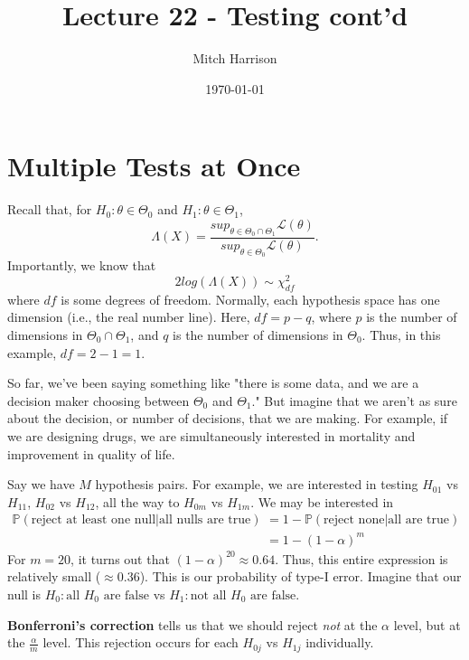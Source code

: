 \documentclass[titlepage, 12pt, leqno]{article}
\title{\Huge{Lecture 22 - Testing cont'd}}
\author{\large{Mitch Harrison}}
\date{\today}
\begin{document}
\setlength{\parskip}{1\baselineskip}
\setlength{\parindent}{15pt}
\maketitle
\tableofcontents
\newpage


\section{Multiple Tests at Once}

Recall that, for $H_{0}:\theta \in \Theta_{0}$ and $H_{1}:\theta \in \Theta_{1}$,
\[
\Lambda(X) = \frac{sup_{\theta \in \Theta_{0} \cap \Theta_{1}}
\mathcal{L}(\theta)}{sup_{\theta \in \Theta_{0}}\mathcal{L}(\theta)}.
\]
Importantly, we know that
\[
2log(\Lambda(X)) \sim \chi^{2}_{df}
\]
where $df$ is some degrees of freedom. Normally, each hypothesis space has one
dimension (i.e., the real number line). Here, $df = p - q$, where $p$ is the
number of dimensions in $\Theta_{0} \cap \Theta_{1}$, and $q$ is the number of
dimensions in $\Theta_{0}$. Thus, in this example, $df = 2 - 1 = 1$.

So far, we've been saying something like "there is some data, and we are a
decision maker choosing between $\Theta_{0}$ and $\Theta_{1}$." But imagine that
we aren't as sure about the decision, or number of decisions, that we are 
making. For example, if we are designing drugs, we are simultaneously interested
in mortality and improvement in quality of life. 

Say we have $M$ hypothesis pairs. For example, we are interested in testing
$H_{01}$ vs $H_{11}$, $H_{02}$ vs $H_{12}$, all the way to $H_{0m}$ vs
$H_{1m}$. We may be interested in
\begin{align*}
\mathbb{P}( \text{reject at least one null} | \text{all nulls are true})
&= 1 - \mathbb{P}( \text{reject none} | \text{all are true}) \\
&= 1 - (1 - \alpha)^{m}
\end{align*}
For $m = 20$, it turns out that $(1-\alpha)^{20} \approx 0.64$. Thus, this
entire expression is relatively small ($\approx 0.36$). This is our probability
of type-I error. Imagine that our null is $H_{0}: \text{all $H_{0}$ are false}$ 
vs $H_{1}: \text{not all $H_{0}$ are false}$.

\begin{definition}
    \textbf{Bonferroni's correction} tells us that we should reject \textit{not}
    at the $\alpha$ level, but at the $\frac{\alpha}{m}$ level. This rejection
    occurs for each $H_{0j}$ vs $H_{1j}$ individually.
\end{definition}
\end{document}
